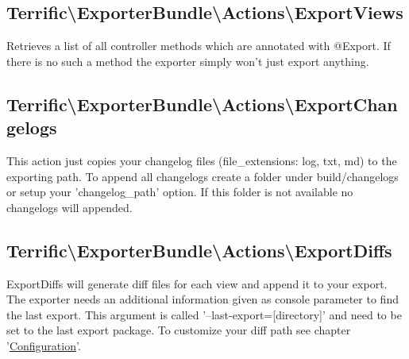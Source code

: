 \noindent \begin{minipage}{\textwidth}
\vspace{1.5em}
\hypertarget{sec-Actions-ExportViews}{\subsection{Terrific\textnormal{\textbackslash}ExporterBundle\textnormal{\textbackslash}Actions\textnormal{\textbackslash}ExportViews}}
Retrieves a list of all controller methods which are annotated with @Export. If there is no such a method the exporter simply won't just export anything.
\end{minipage}

\noindent \begin{minipage}{\textwidth}
\vspace{1.5em}
\hypertarget{sec-Actions-ExportChangelogs}{\subsection{Terrific\textnormal{\textbackslash}ExporterBundle\textnormal{\textbackslash}Actions\textnormal{\textbackslash}ExportChangelogs}}
This action just copies your changelog files (file\_extensions: log, txt, md) to the exporting path. To append all changelogs create a folder under build/changelogs or setup your \mbox{'changelog\_path'} option. If this folder is not available no changelogs will appended.
\end{minipage}

\noindent \begin{minipage}{\textwidth}
\vspace{1.5em}
\hypertarget{sec-Actions-ExportDiffs}{\subsection{Terrific\textnormal{\textbackslash}ExporterBundle\textnormal{\textbackslash}Actions\textnormal{\textbackslash}ExportDiffs}}
ExportDiffs will generate diff files for each view and append it to your export. The exporter needs an additional information given as console parameter to find the last export. This argument is called \mbox{'--last-export=[directory]'} and need to be set to the last export package. To customize your diff path see chapter \mbox{'\hyperlink{chap-Configuration}{Configuration}'}.
\end{minipage}

